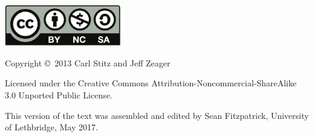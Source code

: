 \noindent\hskip -1in\begin{minipage}{2.1in}
\begin{center}
\includegraphics[width=2in]{figures/license}
\end{center}
\end{minipage}
\begin{minipage}{3in}
Copyright \copyright\ 2013 Carl Stitz and Jeff Zeager

Licensed under the Creative Commons Attribution-Noncommercial-ShareAlike 3.0 Unported Public License.

This version of the text was assembled and edited by Sean Fitzpatrick, University of Lethbridge, May 2017. 
\end{minipage}



